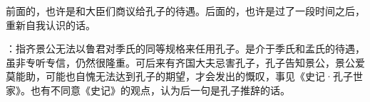 {
\item 前面的，也许是和大臣们商议给孔子的待遇。后面的，也许是过了一段时间之后，重新自我认识的话。
\item {}：指齐景公无法以鲁君对季氏的同等规格来任用孔子。是介于季氏和孟氏的待遇，虽非专听专信，仍然很隆重。可后来有齐国大夫忌害孔子，孔子告知景公，景公爱莫能助，可能也自愧无法达到孔子的期望，才会发出的慨叹，事见《史记·孔子世家》。也有不同意《史记》的观点，认为后一句是孔子推辞的话。
}
{}


